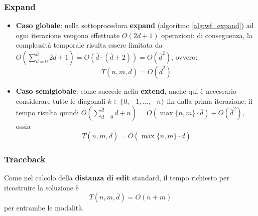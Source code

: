 \subsubsection{Expand}
    \begin{itemize}
        \item \textbf{Caso globale}: nella sottoprocedura \textbf{expand} (algoritmo \ref{alg:wf_expand}) ad ogni iterazione vengono effettuate $O(2d+1)$ operazioni: di conseguenza, la complessità temporale risulta essere limitata da $O(\sum_{d=0}^{\overline{d}}{2d+1}) = O(\overline{d} \cdot (\overline{d}+2)) = O(\overline{d}^2)$, ovvero:
        $$T(n, m, \overline{d}) = O(\overline{d}^2)$$

        \item \textbf{Caso semiglobale}: come succede nella \textbf{extend}, anche qui è necessario considerare tutte le diagonali $k \in \{0, -1, ..., -n\}$ fin dalla prima iterazione; il tempo risulta quindi $O(\sum_{d=0}^{\overline{d}}{d+n}) = O(\max\{n, m\} \cdot \overline{d}) + O(\overline{d}^2)$, ossia
        \begin{equation*}
            T(n, m, \overline{d}) = O(\max\{n, m\} \cdot \overline{d})
        \end{equation*}
    \end{itemize}
   

\subsubsection{Traceback}
    Come nel calcolo della \textbf{distanza di edit} standard, il tempo richiesto per ricostruire la soluzione è
    $$T(n, m, \overline{d}) = O(n + m)$$
    per entrambe le modalità.
    
